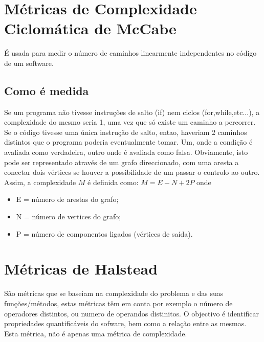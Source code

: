 \documentclass[a4paper,10pt,openright,openbib,twocolumn]{article}
\begin{document}
\section{Métricas de Complexidade Ciclomática de McCabe}
É usada para medir o número de caminhos linearmente independentes no código de um software. 

\subsection{Como é medida}
Se um programa não tivesse instruções de salto (if) nem ciclos (for,while,etc...), a complexidade do mesmo seria 1, uma vez que só existe um caminho a percorrer. 
Se o código tivesse uma única instrução de salto, entao, haveriam 2 caminhos distintos que o programa poderia eventualmente tomar. Um, onde a condição é avaliada como verdadeira, outro onde é avaliada como falsa. Obviamente, isto pode ser representado através de um grafo direccionado, com uma aresta a conectar dois vértices se houver a possibilidade de um passar o controlo ao outro. Assim, a complexidade $M$ é definida como: $M = E - N + 2P$ onde
\begin{itemize}
	\item E = número de arestas do grafo;
	\item N = número de vertices do grafo;
	\item P = número de componentos ligados (vértices de saída).
\end{itemize}


\section{Métricas de Halstead}
São métricas que se baseiam na complexidade do problema e das suas funções/métodos, estas métricas têm em conta por exemplo o número de operadores distintos, ou numero de operandos distinitos. O objectivo é identificar propriedades quantificáveis do sofware, bem como a relação entre as mesmas. Esta métrica, não é apenas uma métrica de complexidade. 
\end{document}
